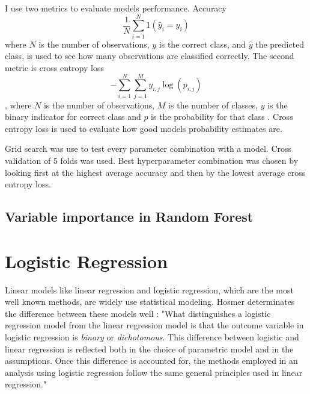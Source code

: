 I use two metrics to evaluate models performance. Accuracy
\begin{equation}
    \frac { 1 } { N} \sum _ { i = 1 } ^ {N} 1 \left( \hat { y } _ { i } = y _ { i } \right)
\end{equation}
where $N$ is the number of observations, $y$ is the correct class, and $\hat { y }$ the predicted class, is used to see how many observations are classified correctly. The second metric is cross entropy loss
\begin{equation}
    - \sum _ { i = 1 } ^ { N }\sum _ { j = 1 } ^ { M } y _ { i,j } \log \left( p _ { i,j } \right)
\end{equation}, where $N$ is the number of observations, $M$ is the number of classes, $y$ is the binary indicator for correct class and $p$ is the probability for that class \cite{nasrabadi2007pattern}. Cross entropy loss is used to evaluate how good models probability estimates are.

Grid search was use to test every parameter combination with a model. Cross validation of 5 folds was used. Best hyperparameter combination was chosen by looking first at the highest average accuracy and then by the lowest average cross entropy loss.


\subsection{Variable importance in Random Forest}
\section{Logistic Regression}
Linear models like linear regression and logistic regression, which are the most well known methods, are widely use statistical modeling. Hosmer determinates the difference between these models well \cite{hosmer2013applied}: "What distinguishes a logistic regression model from  the linear regression model is that the outcome variable in logistic regression is \textit{binary} or \textit{dichotomous}. This difference between logistic and linear regression is reflected both in the choice of parametric model and in the assumptions. Once this difference is accounted for, the methods employed in an analysis using logistic regression follow the same general principles used in linear regression."

